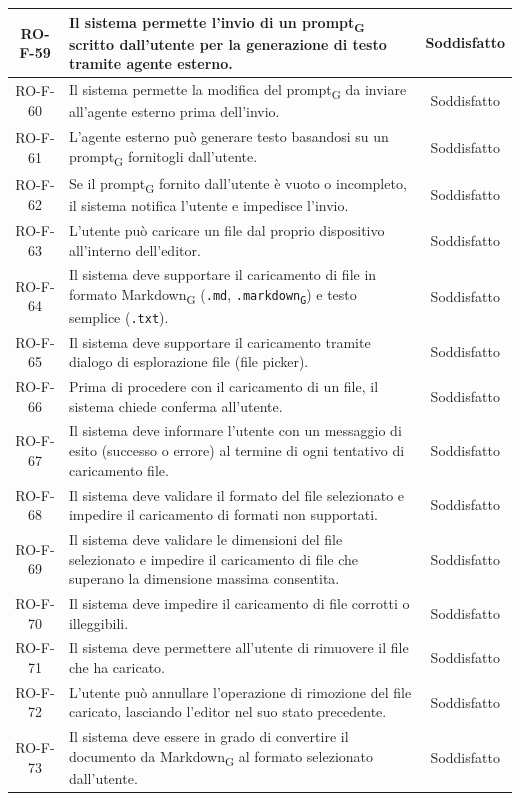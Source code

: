 \documentclass[11pt,a4paper]{article}
\newcommand{\gls}[1]{#1\textsubscript{G}}
\begin{document}
\begin{longtable}{|c|p{11cm}|c|}
\hline
RO-F-59 & Il sistema permette l'invio di un \gls{prompt} scritto dall'utente per la generazione di testo tramite agente esterno. & Soddisfatto \\
\hline
RO-F-60 & Il sistema permette la modifica del \gls{prompt} da inviare all'agente esterno prima dell'invio. & Soddisfatto \\
\hline
RO-F-61 & L'agente esterno può generare testo basandosi su un \gls{prompt} fornitogli dall'utente. & Soddisfatto \\
\hline
RO-F-62 & Se il \gls{prompt} fornito dall'utente è vuoto o incompleto, il sistema notifica l'utente e impedisce l'invio. & Soddisfatto \\
\hline
RO-F-63 & L'utente può caricare un file dal proprio dispositivo all'interno dell'editor. & Soddisfatto \\
\hline
RO-F-64 & Il sistema deve supportare il caricamento di file in formato \gls{Markdown} (\texttt{.md}, \texttt{.\gls{markdown}}) e testo semplice (\texttt{.txt}). & Soddisfatto \\
\hline
RO-F-65 & Il sistema deve supportare il caricamento tramite dialogo di esplorazione file (file picker). & Soddisfatto \\
\hline
RO-F-66 & Prima di procedere con il caricamento di un file, il sistema chiede conferma all'utente. & Soddisfatto \\
\hline
RO-F-67 & Il sistema deve informare l'utente con un messaggio di esito (successo o errore) al termine di ogni tentativo di caricamento file. & Soddisfatto \\
\hline
RO-F-68 & Il sistema deve validare il formato del file selezionato e impedire il caricamento di formati non supportati. & Soddisfatto \\
\hline
RO-F-69 & Il sistema deve validare le dimensioni del file selezionato e impedire il caricamento di file che superano la dimensione massima consentita. & Soddisfatto \\
\hline
RO-F-70 & Il sistema deve impedire il caricamento di file corrotti o illeggibili. & Soddisfatto \\
\hline
RO-F-71 & Il sistema deve permettere all'utente di rimuovere il file che ha caricato. & Soddisfatto \\
\hline
RO-F-72 & L'utente può annullare l'operazione di rimozione del file caricato, lasciando l'editor nel suo stato precedente. & Soddisfatto \\
\hline
RO-F-73 & Il sistema deve essere in grado di convertire il documento da \gls{Markdown} al formato selezionato dall'utente. & Soddisfatto \\

\end{longtable}
\end{document}
